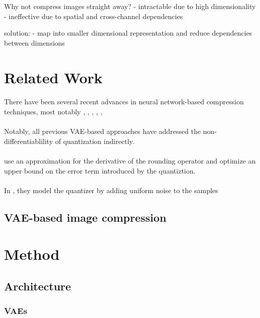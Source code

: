 \documentclass{article}
\begin{document}
Why not compress images straight away?
- intractable due to high dimensionality
- ineffective due to spatial and cross-channel dependencies

solution:
- map into smaller dimensional representation and reduce dependencies between dimensions

\section{Related Work}
\paragraph{}
There have been several recent advances in neural network-based compression
techniques, most notably \cite{balle2016end}, \cite{theis2017lossy},
\cite{rippel2017real}, \cite{balle2018variational}, \cite{johnston2018cvpr},
\cite{mentzer2018cvpr} 
\paragraph{}
Notably, all previous VAE-based approaches have addressed the
non-differentiablility of quantization indirectly.
\paragraph{}
\cite{theis2017lossy} use an approximation for the derivative of the rounding
operator and optimize an upper bound on the error term introduced by the
quantiztion.
\paragraph{}
In \cite{balle2016end},\cite{balle2018variational} they model the quantizer by
adding uniform noise to the samples 
\subsection{VAE-based image compression}
\section{Method}

\subsection{Architecture}
\subsubsection{VAEs}
\end{document}
